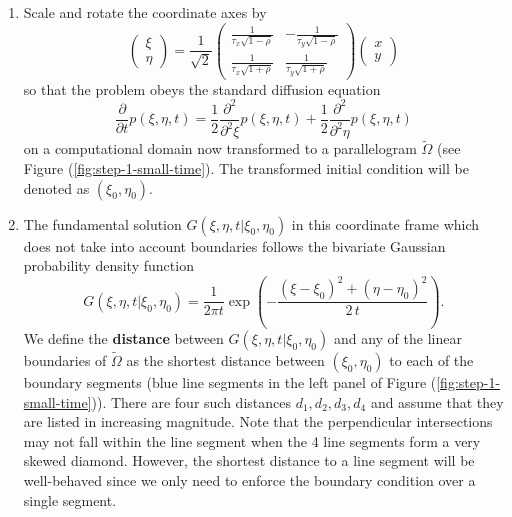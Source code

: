 \documentclass[10pt]{article}
\begin{document}
\begin{enumerate}[1.]
\item Scale and rotate the coordinate axes by
  \[
    \left( \begin{array}{c}
             \xi \\
             \eta
           \end{array} \right) = \frac{1}{\sqrt{2}}
         \left( \begin{array}{cc}
                  \frac{1}{\tau_x \sqrt{1-\rho}} & -\frac{1}{\tau_y\sqrt{1-\rho}}\\
                  \frac{1}{\tau_x \sqrt{1+\rho}} & \frac{1}{\tau_y\sqrt{1+\rho}}
                \end{array} \right)
             \left( \begin{array}{cc}
             x \\
             y
           \end{array} \right) 
       \]
       so that the problem obeys the standard diffusion equation
       \[
         \frac{\partial }{\partial t}p(\xi,\eta,t) =
         \frac{1}{2}\frac{\partial^2 }{\partial^2 \xi} p(\xi,\eta,t)+
         \frac{1}{2}\frac{\partial^2 }{\partial^2 \eta} p(\xi,\eta,t)
       \]
       on a computational domain now transformed to a parallelogram
       $\tilde{\Omega}$ (see Figure (\ref{fig:step-1-small-time}). The
       transformed initial condition will be denoted as
       $(\xi_0, \eta_0)$.

     \item The fundamental solution $G(\xi,\eta,t | \xi_0, \eta_0)$ in
       this coordinate frame which does not take into account
       boundaries follows the bivariate Gaussian probability density
       function
  \[
    G(\xi,\eta,t | \xi_0, \eta_0) = \frac{1}{2\pi t} \exp\left(-\frac{(\xi-\xi_0)^2 +
        (\eta-\eta_0)^2}{2\,t} \right).
  \]
  We define the \textbf{distance} between
  $G(\xi,\eta,t | \xi_0, \eta_0)$ and any of the linear boundaries of
  $\tilde{\Omega}$ as the shortest distance between $(\xi_0, \eta_0)$
  to each of the boundary segments (blue line segments in the left
  panel of Figure (\ref{fig:step-1-small-time})).  There are four such
  distances $d_1, d_2, d_3, d_4$ and assume that they are listed in
  increasing magnitude. Note that the perpendicular intersections may
  not fall within the line segment when the 4 line segments form a
  very skewed diamond. However, the shortest distance to a line
  segment will be well-behaved since we only need to enforce the
  boundary condition over a single segment.


\end{enumerate}
\end{document}
